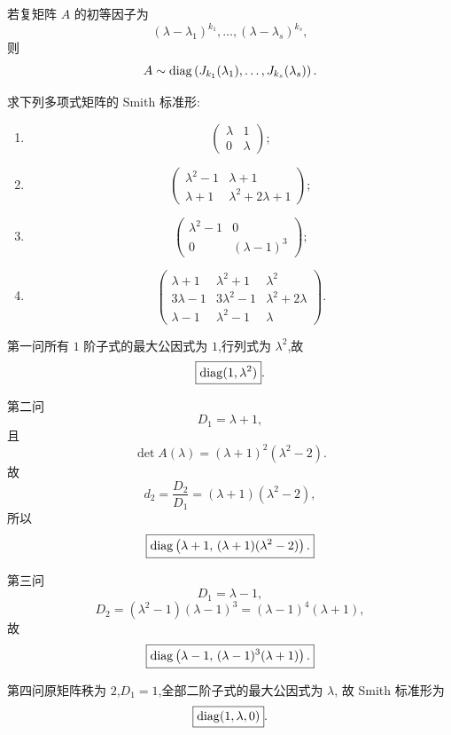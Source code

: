 \begin{theorem}[\markstar]
若复矩阵 $A$ 的初等因子为
\[
(\lambda-\lambda_1)^{k_1},\ldots,
(\lambda-\lambda_s)^{k_s},
\]
则
\[
A
\sim
\operatorname{diag}\left(
J_{k_1}(\lambda_1),\ldots,J_{k_s}(\lambda_s)
\right).
\]
\end{theorem}


\begin{example}
求下列多项式矩阵的 Smith 标准形:
\begin{enumerate}
    \item
    \[
    \begin{pmatrix}
    \lambda&1\\
    0&\lambda
    \end{pmatrix};
    \]
    \item
    \[
    \begin{pmatrix}
    \lambda^2-1&\lambda+1\\
    \lambda+1&\lambda^2+2\lambda+1
    \end{pmatrix};
    \]
    \item
    \[
    \begin{pmatrix}
    \lambda^2-1&0\\
    0&(\lambda-1)^3
    \end{pmatrix};
    \]
    \item
    \[
    \begin{pmatrix}
    \lambda+1&\lambda^2+1&\lambda^2\\
    3\lambda-1&3\lambda^2-1&\lambda^2+2\lambda\\
    \lambda-1&\lambda^2-1&\lambda
    \end{pmatrix}.
    \]
\end{enumerate}
\end{example}
\exampleblank

\begin{solution}
第一问所有 $1$ 阶子式的最大公因式为 $1$,行列式为 $\lambda^2$,故
\[
\boxed{\operatorname{diag}(1,\lambda^2)}.
\]

第二问
\[
D_1=\lambda+1,
\]
且
\[
\det A(\lambda)
=
(\lambda+1)^2(\lambda^2-2).
\]
故
\[
d_2
=
\dfrac{D_2}{D_1}
=
(\lambda+1)(\lambda^2-2),
\]
所以
\[
\boxed{
\operatorname{diag}\left(
\lambda+1,\,
(\lambda+1)(\lambda^2-2)
\right).
}
\]

第三问
\[
D_1=\lambda-1,
\]
\[
D_2=(\lambda^2-1)(\lambda-1)^3
=(\lambda-1)^4(\lambda+1),
\]
故
\[
\boxed{
\operatorname{diag}\left(
\lambda-1,\,
(\lambda-1)^3(\lambda+1)
\right).
}
\]

第四问原矩阵秩为 $2$,$D_1=1$,全部二阶子式的最大公因式为 $\lambda$,
故 Smith 标准形为
\[
\boxed{\operatorname{diag}(1,\lambda,0)}.
\]
\end{solution}



